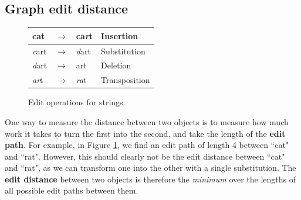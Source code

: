 \documentclass[12pt]{thesis}
\theoremstyle{plain}
\theoremstyle{definition}
\theoremstyle{remark}
\begin{document}
\subsection{Graph edit distance}

\begin{figure}
\centering
\begin{tabular}{|lcl|l|}
\hline
cat & $\rightarrow$ & ca\textit{r}t & Insertion \\ \hline
\textit{c}art & $\rightarrow$ & \textit{d}art & Substitution \\ \hline
\textit{d}art & $\rightarrow$ & art & Deletion \\ \hline
\textit{ar}t & $\rightarrow$ & \textit{ra}t & Transposition \\ \hline
\end{tabular}
\caption{Edit operations for strings.}
\label{fig:string_edit_operations}
\end{figure}

One way to measure the distance between two objects is to measure how much work it takes to turn the first into the second, and take the length of the \textbf{edit path}. For example, in Figure \ref{fig:string_edit_operations}, we find an edit path of length 4 between ``cat" and ``rat". However, this should clearly not be the edit distance between ``cat" and ``rat", as we can transform one into the other with a single substitution. The \textbf{edit distance} between two objects is therefore the \textit{minimum} over the lengths of all possible edit paths between them.
\end{document}
